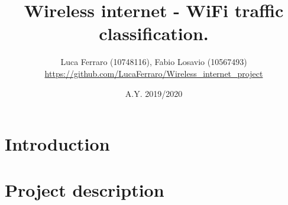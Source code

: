 \documentclass{article} %
\title{\textbf{\huge{Wireless internet - WiFi traffic classification.}}}
\author{Luca Ferraro (10748116), Fabio Losavio (10567493) \\ 
\textcolor{url_blue}{\url{https://github.com/LucaFerraro/Wireless_internet_project}}}
\date{A.Y. 2019/2020}
\begin{document}

\begin{titlingpage}
    \maketitle
\end{titlingpage}

\newpage{}

\tableofcontents

\newpage{}

\clearpage
{\section{Introduction}\label{sect:introduction}}



\clearpage
{\section{Project description}\label{sect:project}}

\end{document}
